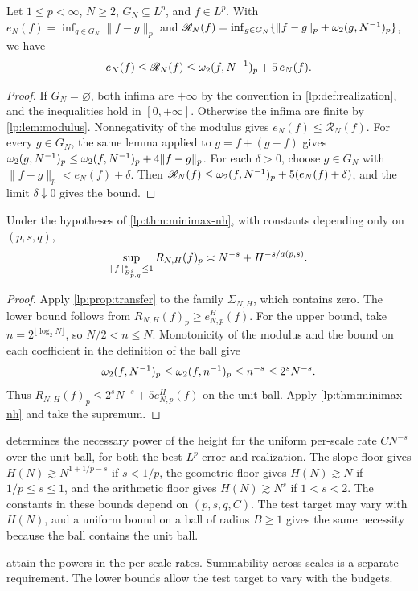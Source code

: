 \documentclass[11pt,a4paper]{article}
\begin{document}
\begin{proposicao}
\label{lp:prop:transfer}
Let $1\le p<\infty$, $N\ge2$, $G_N\subseteq L^p$, and $f\in L^p$. With $e_N(f)=\inf_{g\in G_N}\|f-g\|_p$ and $\mathscr R_N(f)=\inf_{g\in G_N}\{\|f-g\|_p+\omega_2(g,N^{-1})_{p}\}$, we have
\[
 e_N(f)\le\mathscr R_N(f)\le\omega_2(f,N^{-1})_{p}+5\,e_N(f).
\]
\end{proposicao}

\begin{proof}
If $G_N=\varnothing$, both infima are $+\infty$ by the convention in \cref{lp:def:realization}, and the inequalities hold in $[0,+\infty]$. Otherwise the infima are finite by \cref{lp:lem:modulus}. Nonnegativity of the modulus gives $e_N(f)\le\mathscr R_N(f)$. For every $g\in G_N$, the same lemma applied to $g=f+(g-f)$ gives $\omega_2(g,N^{-1})_{p}\le\omega_2(f,N^{-1})_{p}+4\|f-g\|_p$. For each $\delta>0$, choose $g\in G_N$ with $\|f-g\|_p<e_N(f)+\delta$. Then $\mathscr R_N(f)\le\omega_2(f,N^{-1})_{p}+5(e_N(f)+\delta)$, and the limit $\delta\downarrow0$ gives the bound.
\end{proof}

\begin{corolario}
\label{lp:cor:minimax-realization}
Under the hypotheses of \cref{lp:thm:minimax-nh}, with constants depending only on $(p,s,q)$,
\[
 \sup_{\|f\|^*_{B^{s}_{p,q}}\le1}R_{N,H}(f)_p
 \asymp N^{-s}+H^{-s/a(p,s)}.
\]
\end{corolario}

\begin{proof}
Apply \cref{lp:prop:transfer} to the family $\Sigma_{N,H}$, which contains zero. The lower bound follows from $R_{N,H}(f)_p\ge e^H_{N,p}(f)$. For the upper bound, take $n=2^{\lfloor\log_2N\rfloor}$, so $N/2<n\le N$. Monotonicity of the modulus and the bound on each coefficient in the definition of the ball give
\[
 \omega_2(f,N^{-1})_{p}\le\omega_2(f,n^{-1})_{p}\le n^{-s}\le2^sN^{-s}.
\]
Thus $R_{N,H}(f)_p\le 2^sN^{-s}+5e^H_{N,p}(f)$ on the unit ball. Apply \cref{lp:thm:minimax-nh} and take the supremum.
\end{proof}

\begin{observacao}
\label{lp:obs:floor-closure}
 determines the necessary power of the height for the uniform per-scale rate $CN^{-s}$ over the unit ball, for both the best $L^p$ error and realization. The slope floor gives $H(N)\gtrsim N^{1+1/p-s}$ if $s<1/p$, the geometric floor gives $H(N)\gtrsim N$ if $1/p\le s\le1$, and the arithmetic floor gives $H(N)\gtrsim N^s$ if $1<s<2$. The constants in these bounds depend on $(p,s,q,C)$. The test target may vary with $H(N)$, and a uniform bound on a ball of radius $B\ge1$ gives the same necessity because the ball contains the unit ball.

 attain the powers in the per-scale rates. Summability across scales is a separate requirement. The lower bounds allow the test target to vary with the budgets.
\end{observacao}
\end{document}
